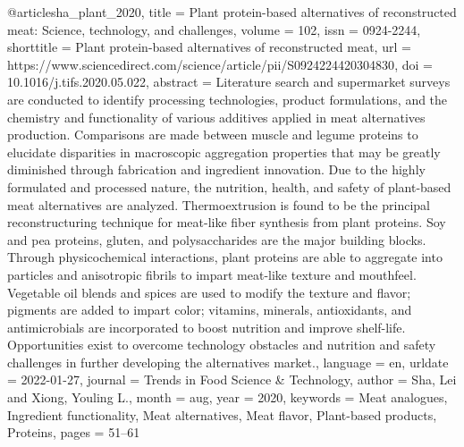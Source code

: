 @article{sha_plant_2020,
	title = {Plant protein-based alternatives of reconstructed meat: {Science}, technology, and challenges},
	volume = {102},
	issn = {0924-2244},
	shorttitle = {Plant protein-based alternatives of reconstructed meat},
	url = {https://www.sciencedirect.com/science/article/pii/S0924224420304830},
	doi = {10.1016/j.tifs.2020.05.022},
	abstract = {Literature search and supermarket surveys are conducted to identify processing technologies, product formulations, and the chemistry and functionality of various additives applied in meat alternatives production. Comparisons are made between muscle and legume proteins to elucidate disparities in macroscopic aggregation properties that may be greatly diminished through fabrication and ingredient innovation. Due to the highly formulated and processed nature, the nutrition, health, and safety of plant-based meat alternatives are analyzed. 
	Thermoextrusion is found to be the principal reconstructuring technique for meat-like fiber synthesis from plant proteins. Soy and pea proteins, gluten, and polysaccharides are the major building blocks. Through physicochemical interactions, plant proteins are able to aggregate into particles and anisotropic fibrils to impart meat-like texture and mouthfeel. Vegetable oil blends and spices are used to modify the texture and flavor; pigments are added to impart color; vitamins, minerals, antioxidants, and antimicrobials are incorporated to boost nutrition and improve shelf-life. Opportunities exist to overcome technology obstacles and nutrition and safety challenges in further developing the alternatives market.},
	language = {en},
	urldate = {2022-01-27},
	journal = {Trends in Food Science \& Technology},
	author = {Sha, Lei and Xiong, Youling L.},
	month = aug,
	year = {2020},
	keywords = {Meat analogues, Ingredient functionality, Meat alternatives, Meat flavor, Plant-based products, Proteins},
	pages = {51--61}
}


